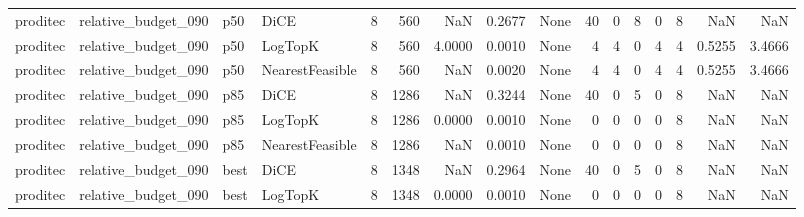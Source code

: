 \begin{tabular}{llllrrrrlrrrrrrr}
proditec &  relative\_budget\_090 &    p50 &            DiCE &            8 &                  560 &                      NaN &      0.2677 &                                               None &     40 &            0 &        8 &              0 &          8 &                NaN &            NaN \\
proditec &  relative\_budget\_090 &    p50 &         LogTopK &            8 &                  560 &                   4.0000 &      0.0010 &                                               None &      4 &            4 &        0 &              4 &          4 &             0.5255 &         3.4666 \\
proditec &  relative\_budget\_090 &    p50 & NearestFeasible &            8 &                  560 &                      NaN &      0.0020 &                                               None &      4 &            4 &        0 &              4 &          4 &             0.5255 &         3.4666 \\
proditec &  relative\_budget\_090 &    p85 &            DiCE &            8 &                 1286 &                      NaN &      0.3244 &                                               None &     40 &            0 &        5 &              0 &          8 &                NaN &            NaN \\
proditec &  relative\_budget\_090 &    p85 &         LogTopK &            8 &                 1286 &                   0.0000 &      0.0010 &                                               None &      0 &            0 &        0 &              0 &          8 &                NaN &            NaN \\
proditec &  relative\_budget\_090 &    p85 & NearestFeasible &            8 &                 1286 &                      NaN &      0.0010 &                                               None &      0 &            0 &        0 &              0 &          8 &                NaN &            NaN \\
proditec &  relative\_budget\_090 &   best &            DiCE &            8 &                 1348 &                      NaN &      0.2964 &                                               None &     40 &            0 &        5 &              0 &          8 &                NaN &            NaN \\
proditec &  relative\_budget\_090 &   best &         LogTopK &            8 &                 1348 &                   0.0000 &      0.0010 &                                               None &      0 &            0 &        0 &              0 &          8 &                NaN &            NaN \\

\end{tabular}
